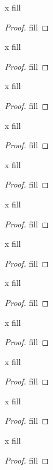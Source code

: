 \begin{exercise}{x}
fill
\end{exercise}
\begin{proof}
fill
\end{proof} 

\begin{exercise}{x}
fill
\end{exercise}
\begin{proof}
fill
\end{proof} 

\begin{exercise}{x}
fill
\end{exercise}
\begin{proof}
fill
\end{proof} 

\begin{exercise}{x}
fill
\end{exercise}
\begin{proof}
fill
\end{proof} 

\begin{exercise}{x}
fill
\end{exercise}
\begin{proof}
fill
\end{proof} 

\begin{exercise}{x}
fill
\end{exercise}
\begin{proof}
fill
\end{proof} 

\begin{exercise}{x}
fill
\end{exercise}
\begin{proof}
fill
\end{proof} 

\begin{exercise}{x}
fill
\end{exercise}
\begin{proof}
fill
\end{proof} 

\begin{exercise}{x}
fill
\end{exercise}
\begin{proof}
fill
\end{proof} 

\begin{exercise}{x}
fill
\end{exercise}
\begin{proof}
fill
\end{proof} 

\begin{exercise}{x}
fill
\end{exercise}
\begin{proof}
fill
\end{proof} 

\begin{exercise}{x}
fill
\end{exercise}
\begin{proof}
fill
\end{proof} 